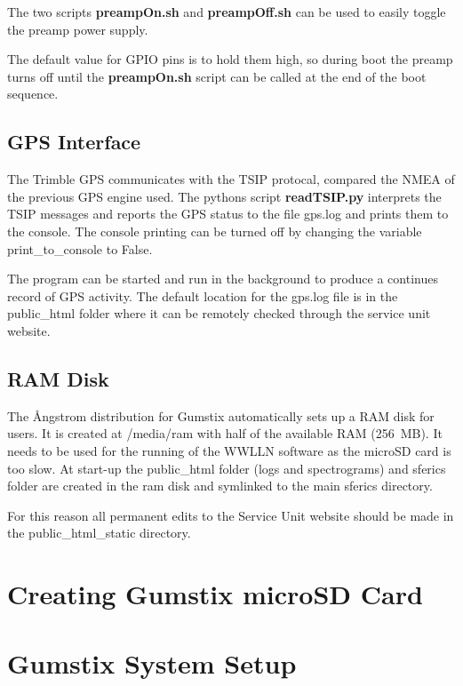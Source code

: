 The two scripts {\bf preampOn.sh} and {\bf preampOff.sh} can be used to easily toggle the preamp power supply.

The default value for GPIO pins is to hold them high, so during boot the preamp turns off until the {\bf preampOn.sh} script can be called at the end of the boot sequence.

\subsection{GPS Interface}

The Trimble GPS communicates with the TSIP protocal, compared the NMEA of the previous GPS engine used.
The pythons script {\bf readTSIP.py} interprets the TSIP messages and reports the GPS status to the file gps.log and prints them to the console.
The console printing can be turned off by changing the variable print\_to\_console to False.

The program can be started and run in the background to produce a continues record of GPS activity.
The default location for the gps.log file is in the public\_html folder where it can be remotely checked through the service unit website.

\subsection{RAM Disk}

The \r{A}ngstrom distribution for Gumstix automatically sets up a RAM disk for users.
It is created at /media/ram with half of the available RAM (256~MB).
It needs to be used for the running of the WWLLN software as the microSD card is too slow.
At start-up the public\_html folder (logs and spectrograms) and sferics folder are created in the ram disk and symlinked to the main sferics directory.

For this reason all permanent edits to the Service Unit website should be made in the public\_html\_static directory.

\section{Creating Gumstix microSD Card}



%

\section{Gumstix System Setup}

